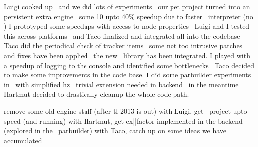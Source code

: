 \stoptopic

\StopSteps

\StartSteps

\starttopic[title={Lua\TeX\\recently done}]

    \startitemize
        \startitem
            Luigi cooked up \LUAJITTEX\ and we did lots of experiments \unknown\
            our pet project turned into an persistent extra engine \unknown\ some
            10 upto 40\% speedup due to faster \LUA\ interpreter (no \type {jit})
        \FlushStep \stopitem
        \startitem
            I prototyped some speedups with access to node properties \unknown\
            Luigi and I tested this across platforms \unknown\ and Taco finalized
            and integrated all into the codebase
        \FlushStep \stopitem
        \startitem
            Taco did the periodical check of tracker items \unknown\ some not too
            intrusive patches and fixes have been applied \unknown\ the new
            \METAPOST\ library has been integrated.
        \FlushStep \stopitem
        \startitem
            I played with a speedup of logging to the console and identified some
            bottlenecks \unknown\ Taco decided to make some improvements in the
            code base.
        \FlushStep \stopitem
        \startitem
            I did some parbuilder experiments in \CONTEXT\ with simplified hz
            \unknown\ trivial extension needed in backend \unknown\ in the
            meantime Hartmut decided to drastically cleanup the whole code path.
        \FlushStep \stopitem
    \stopitemize

\stoptopic

\StopSteps

\StartSteps

\starttopic[title={Lua\TeX\\next on the todo list}]

    \startitemize
        \startitem remove some old engine stuff (after tl 2013 is out) \FlushStep \stopitem
        \startitem with Luigi, get \SWIGLIB\ project upto speed (and running) \FlushStep \stopitem
        \startitem with Hartmut, get ex||factor implemented in the backend (explored in the \LUA\ parbuilder) \FlushStep \stopitem
        \startitem with Taco, catch up on some ideas we have accumulated \FlushStep \stopitem
    \stopitemize

\stoptopic

\StopSteps

\StartSteps

